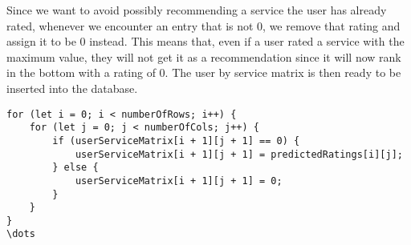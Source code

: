 Since we want to avoid possibly recommending a service the user has already rated, whenever we encounter an entry that is not 0, we remove that rating and assign it to be 0 instead.
This means that, even if a user rated a service with the maximum value, they will not get it as a recommendation since it will now rank in the bottom with a rating of 0.
The user by service matrix is then ready to be inserted into the database.
\begin{lstlisting}[caption={Adding the predictions to the ratings matrix}, captionpos=b, label={lst:predictratingsmatrix}]
for (let i = 0; i < numberOfRows; i++) {
    for (let j = 0; j < numberOfCols; j++) {
        if (userServiceMatrix[i + 1][j + 1] == 0) {
            userServiceMatrix[i + 1][j + 1] = predictedRatings[i][j];
        } else {
            userServiceMatrix[i + 1][j + 1] = 0;
        }
    }
}
\dots
\end{lstlisting}
